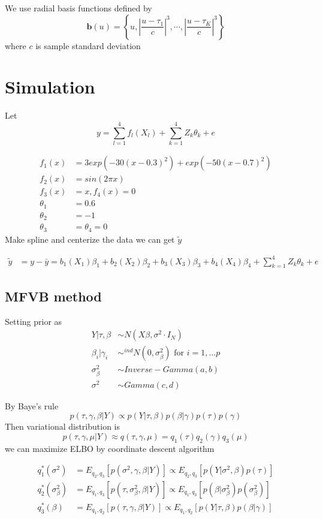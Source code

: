 \documentclass[11pt]{article}
\begin{document}
	We use radial basis functions defined by
	$$
	\mathbf{b}(u) = \left\{  u, \left| \frac{u-\tau_1}{c} \right|^3 , \cdots , \left| \frac{u-\tau_K}{c} \right|^3 \right\}
	$$
	where $c$ is sample standard deviation 
	
	\section{Simulation}
	Let
	$$y = \sum_{l=1}^{4} f_l(X_l) + \sum_{k=1}^{4} Z_k \theta_k + e $$
	
	\begin{align*}
	f_1(x) &= 3exp(-30(x-0.3)^2)+exp(-50(x-0.7)^2)\\
	f_2(x) &= sin(2\pi x)\\
	f_3(x) &= x ,f_4(x) = 0\\
	\theta_1 &= 0.6\\
	\theta_2 &= -1\\
	\theta_3&=\theta_4 = 0
	\end{align*}
	Make spline and centerize the data we can get $\tilde{y}$
	
	\begin{align*}
	\tilde{y} &= y -\bar{y} = b_1(X_1)\beta_1 + b_2(X_2)\beta_2 + b_3(X_3)\beta_3 + b_4(X_4)\beta_4 + \sum_{k=1}^{4} Z_k \theta_k + e
	\end{align*}
	
	
	\subsection{MFVB method}
	
	Setting prior as
	\begin{align*}
	Y|\tau,\beta  &\sim N(X\beta , \sigma^2 \cdot I_N)\\
	\beta_i | \gamma_i &\sim^{ind} N(0,\sigma_{\beta}^2) \text{ for } i=1,\dots p \\
	\sigma_{\beta}^2 &\sim Inverse-Gamma(a,b) \\
	\sigma^2 &\sim Gamma(c,d)   
	\end{align*}
	
	
	
	By Baye's rule
	$$
	p(\tau,\gamma ,\beta | Y) \propto p(Y|\tau,\beta) p(\beta | \gamma) p(\tau) p(\gamma) 
	$$
	Then variational distribution is
	$$
	p(\tau,\gamma ,\mu | Y) \approx q(\tau,\gamma,\mu) = q_1(\tau) q_2(\gamma) q_3(\mu)
	$$
	we can maximize ELBO by coordinate descent algorithm
	
	\begin{align*}
	q_1^*(\sigma^2) &= E_{q_2,q_3}[p(\sigma^2,\gamma ,\beta | Y)] \propto E_{q_2,q_3}[p(Y|\sigma^2,\beta)  p(\tau)]\\
	q_2^*(\sigma_{\beta}^2) &= E_{q_1,q_3}[p(\tau,\sigma_{\beta}^2 ,\beta | Y)] \propto E_{q_1,q_3}[ p(\beta | \sigma_{\beta}^2)   p(\sigma_{\beta}^2)]\\
	q_3^*(\beta) &= E_{q_1,q_2}[p(\tau,\gamma ,\beta | Y)] \propto E_{q_1,q_2}[p(Y|\tau,\beta) p(\beta | \gamma)   ]\\
	\end{align*}
	
\end{document}
